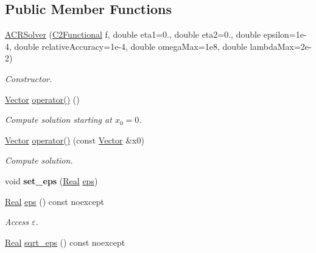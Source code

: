 \subsection*{Public Member Functions}
\begin{DoxyCompactItemize}
\item 
\hyperlink{classSpacy_1_1ACR_1_1ACRSolver_a2b442c8c3149e3d9ba866d9d60c8e014}{A\-C\-R\-Solver} (\hyperlink{classSpacy_1_1C2Functional}{C2\-Functional} f, double eta1=0., double eta2=0., double epsilon=1e-\/4, double relative\-Accuracy=1e-\/4, double omega\-Max=1e8, double lambda\-Max=2e-\/2)
\begin{DoxyCompactList}\small\item\em Constructor. \end{DoxyCompactList}\item 
\hypertarget{classSpacy_1_1ACR_1_1ACRSolver_ae68748adce75b5762ac7005024e29974}{\hyperlink{classSpacy_1_1Vector}{Vector} \hyperlink{classSpacy_1_1ACR_1_1ACRSolver_ae68748adce75b5762ac7005024e29974}{operator()} ()}\label{classSpacy_1_1ACR_1_1ACRSolver_ae68748adce75b5762ac7005024e29974}

\begin{DoxyCompactList}\small\item\em Compute solution starting at $x_0=0$. \end{DoxyCompactList}\item 
\hyperlink{classSpacy_1_1Vector}{Vector} \hyperlink{classSpacy_1_1ACR_1_1ACRSolver_ac7bc2ff6568728c4bd79f49f3596d2bc}{operator()} (const \hyperlink{classSpacy_1_1Vector}{Vector} \&x0)
\begin{DoxyCompactList}\small\item\em Compute solution. \end{DoxyCompactList}\item 
\hypertarget{classSpacy_1_1Mixin_1_1Eps_a818ab6dfab5e4eea583e1302bcc621f8}{void {\bfseries set\-\_\-eps} (\hyperlink{classSpacy_1_1Real}{Real} \hyperlink{classSpacy_1_1Mixin_1_1Eps_a812b99b0abc1d78a34b4114907f23f52}{eps})}\label{classSpacy_1_1Mixin_1_1Eps_a818ab6dfab5e4eea583e1302bcc621f8}

\item 
\hypertarget{classSpacy_1_1Mixin_1_1Eps_a812b99b0abc1d78a34b4114907f23f52}{\hyperlink{classSpacy_1_1Real}{Real} \hyperlink{classSpacy_1_1Mixin_1_1Eps_a812b99b0abc1d78a34b4114907f23f52}{eps} () const noexcept}\label{classSpacy_1_1Mixin_1_1Eps_a812b99b0abc1d78a34b4114907f23f52}

\begin{DoxyCompactList}\small\item\em Access $\varepsilon$. \end{DoxyCompactList}\item 
\hypertarget{classSpacy_1_1Mixin_1_1Eps_a1c1b0ed7f14ed4967dc7da9295a136d4}{\hyperlink{classSpacy_1_1Real}{Real} \hyperlink{classSpacy_1_1Mixin_1_1Eps_a1c1b0ed7f14ed4967dc7da9295a136d4}{sqrt\-\_\-eps} () const noexcept}\label{classSpacy_1_1Mixin_1_1Eps_a1c1b0ed7f14ed4967dc7da9295a136d4}


\end{DoxyCompactItemize}

